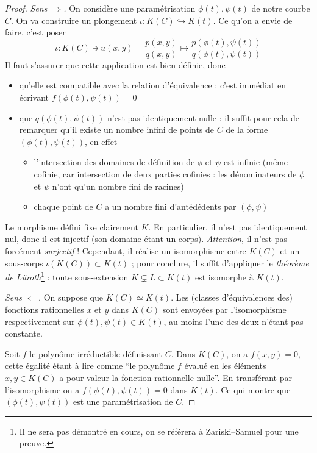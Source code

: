 \documentclass[a4paper, 11pt]{article}
\theoremstyle{definition}
\begin{document}
\begin{proof}
  \textit{Sens $\Rightarrow$.} On considère une paramétrisation
  $\phi(t), \psi(t)$ de notre courbe $C$. On va construire un
  plongement $\iota : K(C) \hookrightarrow K(t)$. Ce qu'on a envie de
  faire, c'est poser
  \[ \iota : K(C) \ni u(x,y) = \frac{p(x,y)}{q(x,y)} \mapsto
  \frac{p(\phi(t),\psi(t))}{q(\phi(t),\psi(t))} \]
  Il faut s'assurer que cette application est bien définie, donc
  \begin{itemize}
  \item qu'elle est compatible avec la relation d'équivalence : c'est
    immédiat en écrivant $f(\phi(t),\psi(t)) = 0$
  \item que $q(\phi(t),\psi(t))$ n'est pas identiquement nulle : il
    suffit pour cela de remarquer qu'il existe un nombre infini de
    points de $C$ de la forme $(\phi(t),\psi(t))$, en effet
    \begin{itemize}
    \item l'intersection des domaines de définition de $\phi$ et
      $\psi$ est infinie (même cofinie, car intersection de deux
      parties cofinies : les dénominateurs de $\phi$ et $\psi$ n'ont
      qu'un nombre fini de racines)
    \item chaque point de $C$ a un nombre fini d'antédédents par
      $(\phi, \psi)$
    \end{itemize}
  \end{itemize}
  Le morphisme défini fixe clairement $K$. En particulier, il n'est
  pas identiquement nul, donc il est injectif (son domaine étant un
  corps). \emph{Attention}, il n'est pas forcément \emph{surjectif} !
  Cependant, il réalise un isomorphisme entre $K(C)$ et un sous-corps
  $\iota(K(C)) \subset K(t)$ ; pour conclure, il suffit d'appliquer le
  \emph{théorème de Lüroth}\footnote{Il ne sera pas démontré en cours,
    on se référera à Zariski--Samuel pour une preuve.} : toute
  sous-extension $K \subsetneq L \subset K(t)$ est isomorphe à $K(t)$.

  \textit{Sens $\Leftarrow$.} On suppose que $K(C) \simeq K(t)$. Les
  (classes d'équivalences des) fonctions rationnelles $x$ et $y$ dans
  $K(C)$ sont envoyées par l'isomorphisme respectivement sur
  $\phi(t), \psi(t) \in K(t)$, au moins l'une des deux n'étant pas
  constante.

  Soit $f$ le polynôme irréductible définissant $C$. Dans $K(C)$, on a
  $f(x,y)=0$, cette égalité étant à lire comme \enquote{le polynôme
    $f$ évalué en les éléments $x, y \in K(C)$ a pour valeur la
    fonction rationnelle nulle}. En transférant par l'isomorphisme on
  a $f(\phi(t),\psi(t))=0$ dans $K(t)$. Ce qui montre que
  $(\phi(t), \psi(t))$ est une paramétrisation de $C$.
\end{proof}
\end{document}

